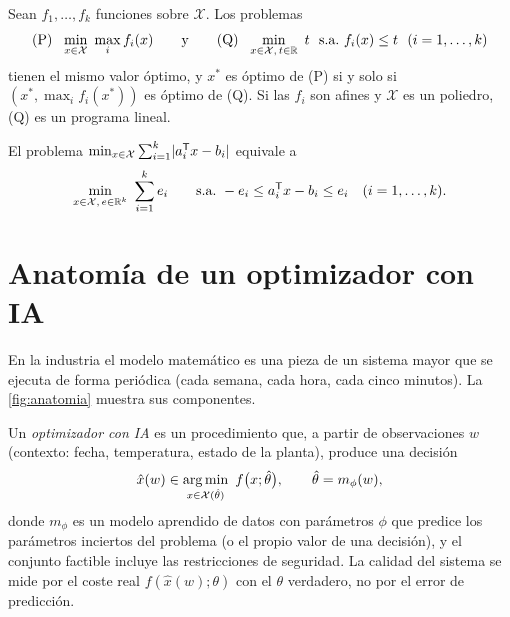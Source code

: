 \begin{proposicion}\label{prop:minimax}
Sean $f_1,\dots,f_k$ funciones sobre $\mathcal{X}$. Los problemas
\[
\text{(P)}\ \ \min_{x\in\mathcal{X}}\ \max_{i}f_i(x)\qquad\text{y}\qquad \text{(Q)}\ \ \min_{x\in\mathcal{X},\,t\in\R}\ t\ \ \st f_i(x)\le t\ \ (i=1,\dots,k)
\]
tienen el mismo valor óptimo, y $x^{*}$ es óptimo de (P) si y solo si $(x^{*},\max_i f_i(x^{*}))$ es óptimo de (Q). Si las $f_i$ son afines y $\mathcal{X}$ es un poliedro, (Q) es un programa lineal.
\end{proposicion}

\begin{proposicion}\label{prop:abs}
El problema $\min_{x\in\mathcal{X}}\sum_{i=1}^{k}\lvert a_i^{\mathsf{T}} x-b_i\rvert$ equivale a
\[
\min_{x\in\mathcal{X},\,e\in\R^{k}}\ \sum_{i=1}^{k}e_i\qquad\st -e_i\le a_i\T x-b_i\le e_i\quad(i=1,\dots,k).
\]
\end{proposicion}

\addtocounter{definicion}{1}%
\addtocounter{table}{1}%

\addtocounter{figure}{1}%

\section{Anatomía de un optimizador con IA}

En la industria el modelo matemático es una pieza de un sistema mayor que se ejecuta de forma periódica (cada semana, cada hora, cada cinco minutos). La \cref{fig:anatomia} muestra sus componentes.

\addtocounter{figure}{1}%

\begin{definicion}\label{def:optimizador-ia}
Un \emph{optimizador con IA} es un procedimiento que, a partir de observaciones $w$ (contexto: fecha, temperatura, estado de la planta), produce una decisión
\[
\hat x(w)\in\argmin_{x\in\mathcal{X}(\hat\theta)}\ f\bigl(x;\hat\theta\bigr),\qquad \hat\theta=m_\phi(w),
\]
donde $m_\phi$ es un modelo aprendido de datos con parámetros $\phi$ que predice los parámetros inciertos del problema (o el propio valor de una decisión), y el conjunto factible incluye las restricciones de seguridad. La calidad del sistema se mide por el coste real $f(\hat x(w);\theta)$ con el $\theta$ verdadero, no por el error de predicción.
\end{definicion}

